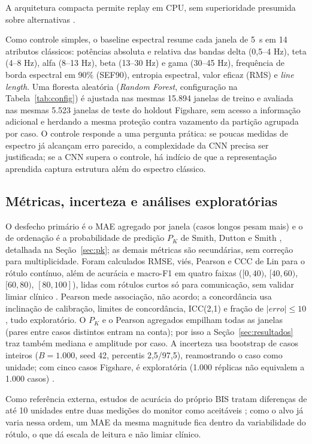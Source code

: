 \documentclass[12pt]{article}
\begin{document}
A arquitetura compacta permite replay em CPU, sem superioridade presumida sobre alternativas \cite{park2020,shi2023}.

Como controle simples, o baseline espectral resume cada janela de 5~s em 14 atributos clássicos: potências absoluta e relativa das bandas delta (0,5--4 Hz), teta (4--8 Hz), alfa (8--13 Hz), beta (13--30 Hz) e gama (30--45 Hz), frequência de borda espectral em 90\% (SEF90), entropia espectral, valor eficaz (RMS) e \textit{line length}. Uma floresta aleatória (\textit{Random Forest}, configuração na Tabela~\ref{tab:config}) é ajustada nas mesmas 15.894 janelas de treino e avaliada nas mesmas 5.523 janelas de teste do holdout Figshare, sem acesso a informação adicional e herdando a mesma proteção contra vazamento da partição agrupada por caso. O controle responde a uma pergunta prática: se poucas medidas de espectro já alcançam erro parecido, a complexidade da CNN precisa ser justificada; se a CNN supera o controle, há indício de que a representação aprendida captura estrutura além do espectro clássico.

\subsection{Métricas, incerteza e análises exploratórias}

O desfecho primário é o MAE agregado por janela (casos longos pesam mais) e o de ordenação é a probabilidade de predição $P_K$ de Smith, Dutton e Smith \cite{smith1996}, detalhada na Seção~\ref{sec:pk}; as demais métricas são secundárias, sem correção para multiplicidade. Foram calculados RMSE, viés, Pearson e CCC de Lin para o rótulo contínuo, além de acurácia e macro-F1 em quatro faixas ($[0,40)$, $[40,60)$, $[60,80)$, $[80,100]$), lidas com rótulos curtos só para comunicação, sem validar limiar clínico \cite{tripodai}. Pearson mede associação, não acordo; a concordância usa inclinação de calibração, limites de concordância, ICC(2,1) e fração de $|erro|\leq10$, tudo exploratório. O $P_K$ e o Pearson agregados empilham todas as janelas (pares entre casos distintos entram na conta); por isso a Seção~\ref{sec:resultados} traz também mediana e amplitude por caso. A incerteza usa bootstrap de casos inteiros ($B=1.000$, seed 42, percentis 2,5/97,5), reamostrando o caso como unidade; com cinco casos Figshare, é exploratória (1.000 réplicas não equivalem a 1.000 casos) \cite{field2007,archer2021}.

Como referência externa, estudos de acurácia do próprio BIS tratam diferenças de até 10 unidades entre duas medições do monitor como aceitáveis \cite{dahaba2010,shiraishi2004,harada2021}; como o alvo já varia nessa ordem, um MAE da mesma magnitude fica dentro da variabilidade do rótulo, o que dá escala de leitura e não limiar clínico.
\end{document}
